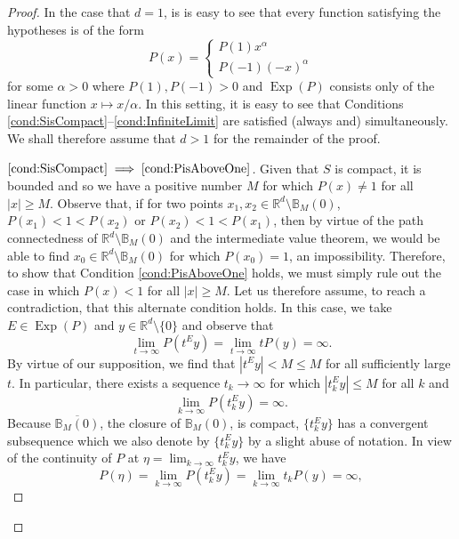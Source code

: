 \documentclass[11pt]{article}
\newcommand*{\myproofname}{Proof}
\newenvironment{subproof}[1][\myproofname]{\begin{proof}[#1]\renewcommand*{\qedsymbol}{$\mathbin{/\mkern-6mu/}$}}{\end{proof}}
\newcommand\Exp{\operatorname{Exp}}
\begin{document}
\begin{proof}
In the case that $d=1$, is is easy to see that every function satisfying the hypotheses is of the form
\begin{equation*}
P(x)=\begin{cases}
P(1)x^\alpha \\
P(-1)(-x)^\alpha
\end{cases}
\end{equation*}
for some $\alpha>0$ where $P(1),P(-1)>0$ and $\Exp(P)$ consists only of the linear function $x\mapsto x/\alpha$. In this setting, it is easy to see that Conditions \ref{cond:SisCompact}--\ref{cond:InfiniteLimit} are satisfied (always and) simultaneously. We shall therefore assume that $d>1$ for the remainder of the proof.

\begin{subproof}[$\ref{cond:SisCompact}\implies\ref{cond:PisAboveOne}$]
Given that $S$ is compact, it is bounded and so we have a positive number $M$ for which $P(x)\neq 1$ for all $|x|\geq M$. Observe that, if for two points $x_1,x_2\in \mathbb{R}^d\setminus\mathbb{B}_M(0)$, $P(x_1)<1<P(x_2)$ or $P(x_2)<1<P(x_1)$, then by virtue of the path connectedness of $\mathbb{R}^d\setminus\mathbb{B}_M(0)$ and the intermediate value theorem, we would be able to find  $x_0\in\mathbb{R}^d\setminus\mathbb{B}_M(0)$ for which $P(x_0)=1$, an impossibility. Therefore, to show that Condition \ref{cond:PisAboveOne} holds, we must simply rule out the case in which $P(x)<1$ for all $|x|\geq M$. Let us therefore assume, to reach a contradiction, that this alternate condition holds. In this case, we take $E\in\Exp(P)$ and $y\in\mathbb{R}^d\setminus \{0\}$ and observe that
\begin{equation*}
\lim_{t\to\infty}P(t^Ey)=\lim_{t\to\infty}tP(y)=\infty.
\end{equation*}
By virtue of our supposition, we find that $|t^Ey|<M\leq M$ for all sufficiently large $t$. In particular, there exists a sequence $t_k\to\infty$ for which $|t_k^Ey|\leq M$ for all $k$ and 
\begin{equation*}
\lim_{k\to\infty}P(t_k^Ey)=\infty.
\end{equation*}
Because $\overline{\mathbb{B}_M(0)}$, the closure of $\mathbb{B}_M(0)$, is compact, $\{t_k^Ey\}$ has a convergent subsequence which we also denote by $\{t_k^Ey\}$ by a slight abuse of notation. In view of the continuity of $P$ at $\eta=\lim_{k\to\infty}t_k^Ey$, we have
\begin{equation*}
P(\eta)=\lim_{k\to\infty}P(t_k^Ey)=\lim_{k\to\infty}t_kP(y)=\infty,

\end{equation*}
\end{subproof}
\end{proof}
\end{document}
